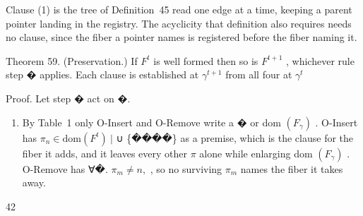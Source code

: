 \documentclass[
  10
]{article}
\providecommand{\tightlist}{%
  \setlength{\itemsep}{0pt}\setlength{\parskip}{0pt}}
\begin{document}
Clause (1) is the tree of Definition~45 read one edge at a time, keeping
a parent pointer landing in the registry. The acyclicity that definition
also requires needs no clause, since the fiber a pointer names is
registered before the fiber naming it.

Theorem 59. (Preservation.) If \(F ^ { t }\) is well formed then so is
\(F ^ { t + 1 }\) , whichever rule step � applies. Each clause is
established at \(\gamma ^ { t + 1 }\) from all four at
\(\gamma ^ { t }\)

Proof. Let step � act on �.

\begin{enumerate}
\def\labelenumi{(\arabic{enumi})}
\tightlist
\item
  By Table~1 only O-Insert and O-Remove write a � or dom
  \(\left( F _ { \gamma } \right)\) . O-Insert has
  \(\pi _ { n } \in \mathrm { d o m } ( F ^ { t } ) ~ |\) ∪ \{����\} as
  a premise, which is the clause for the fiber it adds, and it leaves
  every other \(\pi\) alone while enlarging dom
  \(\left( F _ { \gamma } \right)\) . O-Remove has ∀�.
  \(\pi _ { m } \neq n ,\) , so no surviving \(\pi _ { m }\) names the
  fiber it takes away.
\end{enumerate}

42
\end{document}
